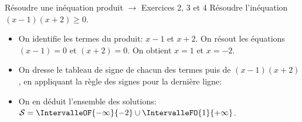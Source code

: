 \documentclass[a4paper]{article}
\begin{document}
  \begin{methode*}[sidebyside, righthand width=2.2cm,segmentation code={}]{ Résoudre une inéquation produit $\longrightarrow$ Exercices 2, 3 et 4}{}
    Résoudre l'inéquation $(x-1)(x+2) \geqslant 0$.
    
    \begin{itemize}
      \item On identifie les termes du produit: $x-1$ et $x+2$. On résout les équations $(x-1)=0$ et $(x+2)=0$. On obtient $x=1$ et $x=-2$.
      \item On dresse le tableau de signe de chacun des termes puis de $(x-1)(x+2)$, en appliquant la règle des signes pour la dernière ligne:
      \begin{center}
      \end{center}
      \item On en déduit l'ensemble des solutions: $\mathcal{S}=\IntervalleOF{-\infty}{-2} \cup \IntervalleFO{1}{+\infty}$.
    \end{itemize}

  \tcblower
  \vspace{4cm}
 \end{methode*}
  
  \pagebreak
  
\end{document}
